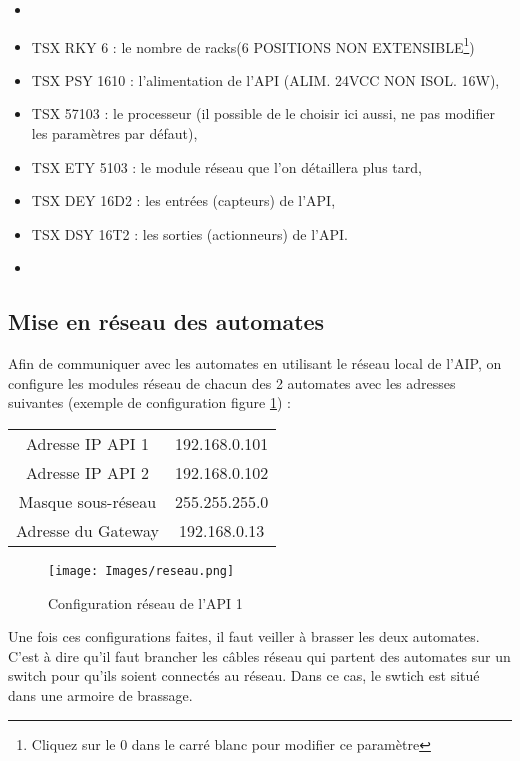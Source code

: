 \documentclass[a4paper,french, titlepage]{book}
\begin{document}
\begin{itemize}
\item[ ] 
\item[ ] TSX RKY 6 : le nombre de racks(6 POSITIONS NON EXTENSIBLE\footnote{Cliquez sur le 0 dans le carré blanc pour modifier ce paramètre})
\item[ ] TSX PSY 1610 : l'alimentation de l'API (ALIM. 24VCC NON ISOL. 16W),
\item[0.] TSX 57103 : le processeur (il possible de le choisir ici aussi, ne pas modifier les paramètres par défaut),
\item[1.] TSX ETY 5103 : le module réseau que l'on détaillera plus tard,
\item[2.] TSX DEY 16D2 : les entrées (capteurs) de l'API,
\item[3.] TSX DSY 16T2 : les sorties (actionneurs) de l'API.
\item[ ]
\end{itemize}


\subsection{Mise en réseau des automates\label{section_reseau}}

Afin de communiquer avec les automates en utilisant le réseau local de l'AIP, on configure les modules réseau de chacun des 2 automates avec les adresses suivantes (exemple de configuration figure \ref{config_reseau_ap1}) :

\begin{center}
\begin{tabular}{cc}
Adresse IP API 1 & 192.168.0.101\\
Adresse IP API 2 & 192.168.0.102\\
Masque sous-réseau & 255.255.255.0\\
Adresse du Gateway & 192.168.0.13\\
\end{tabular}
\end{center}


\begin{figure}[H] 
\begin{center}
\texttt{[image: Images/reseau.png]} 
\end{center}
\caption{Configuration réseau de l'API 1}
\label{config_reseau_ap1}
\end{figure} 

Une fois ces configurations faites, il faut veiller à brasser les deux automates. C'est à dire qu'il faut brancher les câbles réseau qui partent des automates sur un switch pour qu'ils soient connectés au réseau. Dans ce cas, le swtich est situé dans une armoire de brassage.
\end{document}
